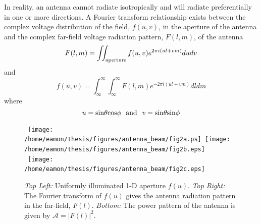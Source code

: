 In reality, an antenna cannot radiate isotropically and will radiate preferentially in one or more directions. A Fourier transform relationship exists between the complex voltage distribution of the field, $f(u,v)$, in the aperture of the antenna and the complex far-field voltage radiation pattern, $F(l,m)$, of the antenna \citep{kraus_1986}
\begin{equation}
F(l,m)=\int\!\!\! \int _{\rm{aperture}} f(u,v)e^{2\pi i(ul+vm)}dudv
\end{equation}
and
\begin{equation}\label{eq:illum1}
f(u,v)=\int ^{\infty} _{\infty}\int ^{\infty} _{\infty} F(l,m)e^{-2\pi i(ul+vm)}dldm
\end{equation}
where
\begin{equation}\label{eq:illum2}
u=\rm{sin}\theta \rm{cos}\phi \ \  \rm{and} \ \ \mathit{v}=\rm{sin}\theta \rm{sin}\phi
\end{equation}

\begin{figure}[H]
\centering 
\mbox{
          \texttt{[image: /home/eamon/thesis/figures/antenna\_beam/fig2a.ps]}
          \texttt{[image: /home/eamon/thesis/figures/antenna\_beam/fig2b.eps]}
          }
\mbox{
          \texttt{[image: /home/eamon/thesis/figures/antenna\_beam/fig2c.eps]}
          }
\caption[Radiation and power pattern of a uniformly illuminated antenna]{\textit{Top Left:} Uniformly illuminated 1-D aperture $f(u)$. \textit{Top Right:} The Fourier transform of $f(u)$ gives the antenna radiation pattern in the far-field, $F(l)$. \textit{Bottom:} The power pattern of the antenna is given by $\mathcal{A}=|F(l)|^2$.}
\label{fig2.1}
\end{figure}


